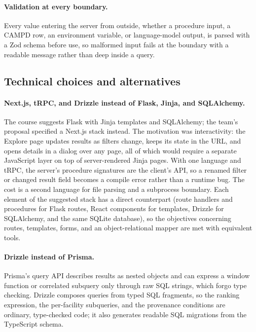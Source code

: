 \documentclass[11pt,a4paper]{article}
\begin{document}
\paragraph{Validation at every boundary.} Every value entering the server from outside,
whether a procedure input, a CAMPD row, an environment variable, or language-model output, is
parsed with a Zod schema before use, so malformed input fails at the boundary with a readable
message rather than deep inside a query.

\subsection{Technical choices and alternatives}

\paragraph{Next.js, tRPC, and Drizzle instead of Flask, Jinja, and SQLAlchemy.} The course
suggests Flask with Jinja templates and SQLAlchemy; the team's proposal specified a Next.js
stack instead. The motivation was interactivity: the Explore page updates results as filters
change, keeps its state in the URL, and opens details in a dialog over any page, all of which would require a
separate JavaScript layer on top of server-rendered Jinja pages. With one language and tRPC,
the server's procedure signatures are the client's API, so a renamed filter or changed result
field becomes a compile error rather than a runtime bug. The cost is a second language for file
parsing and a subprocess boundary. Each element of the suggested stack has a direct
counterpart (route handlers and procedures for Flask routes, React components for templates,
Drizzle for SQLAlchemy, and the same SQLite database), so the objectives concerning routes,
templates, forms, and an object-relational mapper are met with equivalent tools.

\paragraph{Drizzle instead of Prisma.} Prisma's query API describes results as nested objects
and can express a window function or correlated subquery only through raw SQL strings, which
forgo type checking. Drizzle composes queries from typed SQL fragments, so the ranking
expression, the per-facility subqueries, and the provenance conditions are ordinary,
type-checked code; it also generates readable SQL migrations from the TypeScript schema.
\end{document}

